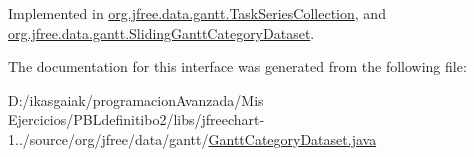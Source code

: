 Implemented in \mbox{\hyperlink{classorg_1_1jfree_1_1data_1_1gantt_1_1_task_series_collection_af4aa8478ec30350d17361e896ef45ee7}{org.\+jfree.\+data.\+gantt.\+Task\+Series\+Collection}}, and \mbox{\hyperlink{classorg_1_1jfree_1_1data_1_1gantt_1_1_sliding_gantt_category_dataset_a4b8246a1601e700946bace11c5b0dc33}{org.\+jfree.\+data.\+gantt.\+Sliding\+Gantt\+Category\+Dataset}}.



The documentation for this interface was generated from the following file\+:\begin{DoxyCompactItemize}
\item 
D\+:/ikasgaiak/programacion\+Avanzada/\+Mis Ejercicios/\+P\+B\+Ldefinitibo2/libs/jfreechart-\/1../source/org/jfree/data/gantt/\mbox{\hyperlink{_gantt_category_dataset_8java}{Gantt\+Category\+Dataset.\+java}}\end{DoxyCompactItemize}
